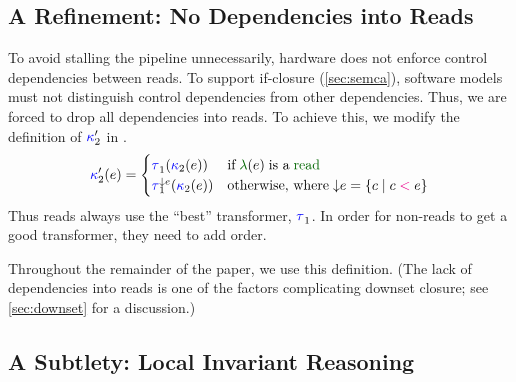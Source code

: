 \subsection{A Refinement: No Dependencies into Reads}
\label{sec:read-read}

To avoid stalling the \CPU{} pipeline unnecessarily, hardware does not
enforce control dependencies between reads.  To support if-closure
(\textsection\ref{sec:semca}), software models must not distinguish control
dependencies from other dependencies.  Thus, we are forced to drop all
dependencies into reads.  To achieve this, we modify the definition of
${\color{blue}\kappa}'_2$ in .
\begin{displaymath}
  \labelingForm'_2(\aEv)=
  \begin{cases}
    \aTr[1]{}{\labelingForm_2(\aEv)} & \text{if}\; \labeling(\aEv) \;\text{is a}\sread
    \\
    \aTr[1]{\Cdown{\aEv}}{\labelingForm_2(\aEv)} & \text{otherwise, where}\; \Cdown{\aEv}=\{ \cEv \mid \cEv \lt \aEv \}
  \end{cases}
\end{displaymath}
Thus reads always use the ``best'' transformer, $\aTr[1]{}{}$.  In order for
non-reads to get a good transformer, they need to add order.
  
Throughout the remainder of the paper, we use this definition.  (The lack of
dependencies into reads is one of the factors complicating downset closure;
see \textsection\ref{sec:downset} for a discussion.)

\subsection{A Subtlety: Local Invariant Reasoning}
\label{sec:lir}
\label{sec:q}

